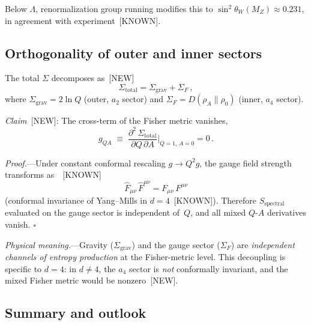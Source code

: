 Below $\Lambda$, renormalization group running
modifies this to
$\sin^2\theta_W(M_Z) \approx 0.231$,
in agreement with experiment~[KNOWN].


\subsection{Orthogonality of outer and inner sectors}
\label{sec:orthogonality}

The total $\Sigma$ decomposes as~[NEW]
\begin{equation}\label{eq:Sigma_total}
  \Sigma_{\mathrm{total}}
  = \Sigma_{\mathrm{grav}}
  + \Sigma_F\,,
\end{equation}
where $\Sigma_{\mathrm{grav}} = 2\ln Q$
(outer, $a_2$ sector) and
$\Sigma_F = D(\rho_A \| \rho_0)$
(inner, $a_4$ sector).

\emph{Claim}~[NEW]:
The cross-term of the Fisher metric
vanishes,
\begin{equation}\label{eq:cross}
  g_{Q A}
  \;\equiv\;
  \frac{\partial^2\, \Sigma_{\mathrm{total}}}
  {\partial Q\,\partial A}
  \bigg|_{Q=1,\, A=0}
  = 0\,.
\end{equation}

\emph{Proof.}---Under constant conformal
rescaling $g \to Q^2 g$,
the gauge field strength transforms
as~\cite{Wald1984}~[KNOWN]
\begin{equation}
  \hat{F}_{\mu\nu}\, \hat{F}^{\mu\nu}
  = F_{\mu\nu}\, F^{\mu\nu}
\end{equation}
(conformal invariance of Yang--Mills in
$d=4$~[KNOWN]).
Therefore $S_{\mathrm{spectral}}$ evaluated
on the gauge sector is independent
of~$Q$, and all mixed
$Q$-$A$ derivatives vanish.
\hfill$\square$

\emph{Physical meaning.}---Gravity
($\Sigma_{\mathrm{grav}}$) and the
gauge sector ($\Sigma_F$) are
\emph{independent channels of entropy
production} at the Fisher-metric level.
This decoupling is specific to $d=4$:
in $d \neq 4$, the $a_4$ sector is
\emph{not} conformally invariant,
and the mixed Fisher metric would be
nonzero~[NEW].


\subsection{Summary and outlook}
\label{sec:AF_summary}

